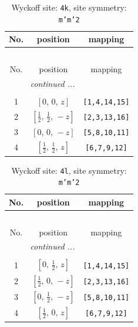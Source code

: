 \documentclass[fleqn,8pt]{jsarticle}
\begin{document}
\renewcommand{\arraystretch}{1.2}
\begin{longtable}{ccc}
\caption{Wyckoff site: {\tt 4k}, site symmetry: {\tt m'm'2}}
 \\
 \hline \hline
No. & position & mapping \\ \hline \endfirsthead

\multicolumn{2}{l}{\tablename\ \thetable{}} \\
 \hline \hline
No. & position & mapping \\ \hline \endhead

 \hline \hline
\multicolumn{2}{r}{\footnotesize\it continued ...} \\ \endfoot

 \hline \hline
\multicolumn{2}{r}{} \\ \endlastfoot

1 & $\left[ 0,\, 0,\, z \right]$ & {\tt [1,4,14,15]} \\ \hline
2 & $\left[ \frac{1}{2},\, \frac{1}{2},\, - z \right]$ & {\tt [2,3,13,16]} \\ \hline
3 & $\left[ 0,\, 0,\, - z \right]$ & {\tt [5,8,10,11]} \\ \hline
4 & $\left[ \frac{1}{2},\, \frac{1}{2},\, z \right]$ & {\tt [6,7,9,12]} \\
\end{longtable}
\renewcommand{\arraystretch}{1.2}
\begin{longtable}{ccc}
\caption{Wyckoff site: {\tt 4l}, site symmetry: {\tt m'm'2}}
 \\
 \hline \hline
No. & position & mapping \\ \hline \endfirsthead

\multicolumn{2}{l}{\tablename\ \thetable{}} \\
 \hline \hline
No. & position & mapping \\ \hline \endhead

 \hline \hline
\multicolumn{2}{r}{\footnotesize\it continued ...} \\ \endfoot

 \hline \hline
\multicolumn{2}{r}{} \\ \endlastfoot

1 & $\left[ 0,\, \frac{1}{2},\, z \right]$ & {\tt [1,4,14,15]} \\ \hline
2 & $\left[ \frac{1}{2},\, 0,\, - z \right]$ & {\tt [2,3,13,16]} \\ \hline
3 & $\left[ 0,\, \frac{1}{2},\, - z \right]$ & {\tt [5,8,10,11]} \\ \hline
4 & $\left[ \frac{1}{2},\, 0,\, z \right]$ & {\tt [6,7,9,12]} \\
\end{longtable}
\end{document}
